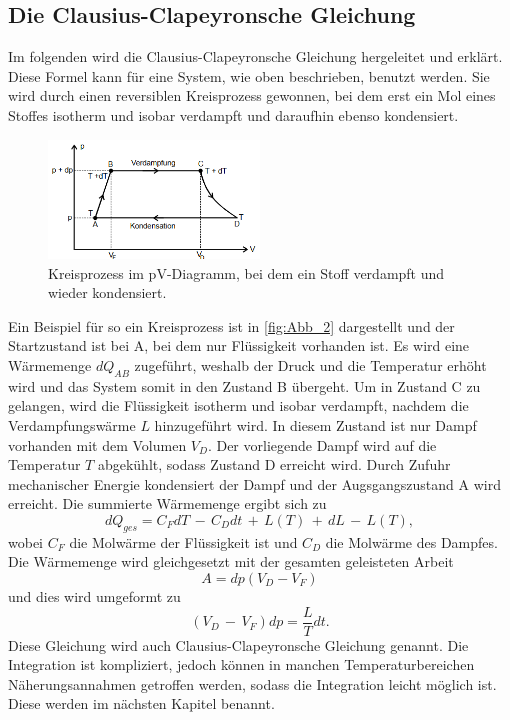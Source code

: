 \subsection{Die Clausius-Clapeyronsche Gleichung} %
\label{sub:CC-Gl}
Im folgenden wird die Clausius-Clapeyronsche Gleichung hergeleitet und erklärt. 
Diese Formel kann für eine System, wie oben beschrieben, benutzt werden.
Sie wird durch einen reversiblen Kreisprozess gewonnen, bei dem erst ein Mol eines Stoffes isotherm und isobar verdampft und daraufhin ebenso kondensiert.
\begin{figure}[H]
    \centering
    \includegraphics[width=0.5\textwidth]{build/Abb_2.PNG}
    \caption {Kreisprozess im pV-Diagramm, bei dem ein Stoff verdampft und wieder kondensiert.\cite{V203}}
    \label{fig:Abb_2}
\end{figure}
Ein Beispiel für so ein Kreisprozess ist in \autoref{fig:Abb_2} dargestellt und der Startzustand ist bei A, bei dem nur Flüssigkeit vorhanden ist.
Es wird eine Wärmemenge $dQ_{AB}$ zugeführt, weshalb der Druck und die Temperatur erhöht wird und das System somit in den Zustand B übergeht.
Um in Zustand C zu gelangen, wird die Flüssigkeit isotherm und isobar verdampft, nachdem die Verdampfungswärme $L$ hinzugeführt wird.
In diesem Zustand ist nur Dampf vorhanden mit dem Volumen $V_D$.
Der vorliegende Dampf wird auf die Temperatur $T$ abgekühlt, sodass Zustand D erreicht wird.
Durch Zufuhr mechanischer Energie kondensiert der Dampf und der Augsgangszustand A wird erreicht.
Die summierte Wärmemenge ergibt sich zu
\begin{equation}
    dQ_{ges} = C_F dT \,-\, C_D dt \,+\, L(T) \,+\, dL \,-\, L(T),
    \label{eqn:Wärmemenge}
\end{equation}
wobei $C_F$ die Molwärme der Flüssigkeit ist und $C_D$ die Molwärme des Dampfes.
Die Wärmemenge wird gleichgesetzt mit der gesamten geleisteten Arbeit
\begin{equation}
    A = dp(V_D-V_F)
    \label{eqn:Arbeit}
\end{equation}
und dies wird umgeformt zu
\begin{equation}
    (V_D\,-\,V_F)dp = \frac{L}{T}dt .
    \label{eqn:CC-Gl}
\end{equation}
Diese Gleichung wird auch Clausius-Clapeyronsche Gleichung genannt. 
Die Integration ist kompliziert, jedoch können in manchen Temperaturbereichen Näherungsannahmen getroffen werden, sodass die Integration leicht möglich ist.
Diese werden im nächsten Kapitel benannt.

